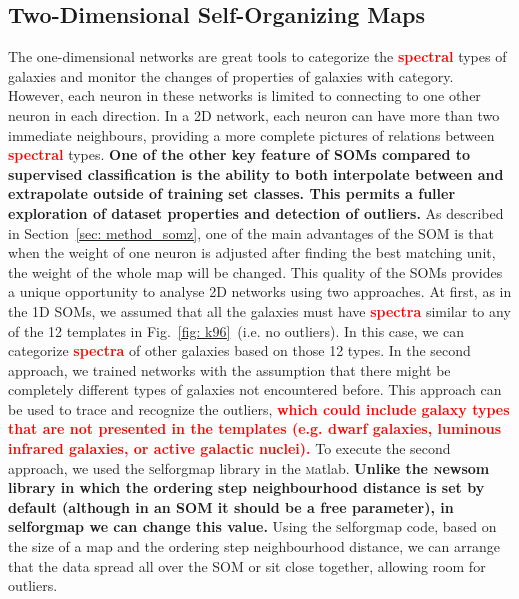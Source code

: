     \subsection{Two-Dimensional Self-Organizing Maps}
    \label{sec: 2D}
    The one-dimensional networks are great tools to categorize the \textbf{\textcolor{red}{spectral}} types of galaxies and monitor the changes of properties of galaxies with category.
    However, each neuron in these networks is limited to connecting to one other neuron in each direction.
    In a 2D network, each neuron can have more than two immediate neighbours, providing a more complete pictures of relations between \textbf{\textcolor{red}{spectral}} types.
    \textbf{One of the other key feature of SOMs compared to supervised classification is the ability to both interpolate between and extrapolate outside of training set classes.
    This permits a fuller exploration of dataset properties and detection of outliers.}
    As described in Section~\ref{sec: method_somz}, one of the main advantages of the SOM is that when the weight of one neuron is adjusted after finding the best matching unit, the weight of the whole map will be changed.
    This quality of the SOMs provides a unique opportunity to analyse 2D networks using two approaches. 
    At first, as in the 1D SOMs, we assumed that all the galaxies must have \textbf{\textcolor{red}{spectra}} similar to any of the 12 templates in Fig.~\ref{fig: k96}~(i.e. no outliers).
    In this case, we can categorize \textbf{\textcolor{red}{spectra}} of other galaxies based on those 12 types.
    In the second approach, we trained networks with the assumption that there might be completely different types of galaxies not encountered before.
    This approach can be used to trace and recognize the outliers, \textbf{\textcolor{red}{which could include galaxy types that are not presented in the  templates (e.g. dwarf galaxies, luminous infrared galaxies, or active galactic nuclei).}}
    To execute the second approach, we used the {\textsc selforgmap} library in the {\textsc matlab}.
    \textbf{Unlike the {\textsc newsom} library in which the ordering step neighbourhood distance is set by default (although in an SOM it should be a free parameter), in {\textsc selforgmap} we can change this value.}
    Using the {\textsc selforgmap} code, based on the size of a map and the ordering step neighbourhood distance, we can arrange that the data spread all over the SOM or sit close together, allowing room for outliers.

